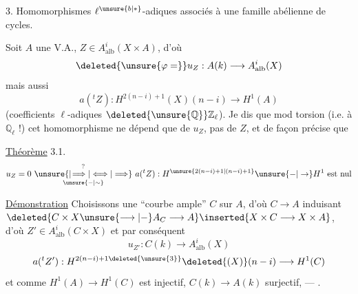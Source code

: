 3. Homomorphismes $\ell^{\unsure{b|*}}$-adiques associés à une
 famille abélienne de cycles.

Soit $A$ une V.A., $Z\in A^i_{\mathrm{alb}}(X\times A)$, d'où
\[
\deleted{\unsure{\varphi=}}u_Z:A(k)\longrightarrow A^i_{\mathrm{alb}}(X)
\]
mais aussi
\[
a({}^t Z):H^{2(n-i)+1}(X)(n-i)\longrightarrow H^1(A)
\]
(coefficients $\ell$-adiques $\deleted{\unsure{\mathbb Q}}\mathbb Z_\ell$). Je dis que
mod torsion (i.e. à  $\mathbb Q_\ell$ !) cet
homomorphisme ne dépend que de $u_Z$, pas de $Z$,
 et de façon précise que

\uline{Théorème} 3.1. 
\[
u_Z=0\ \overset{?}{\underset{\unsure{-|\sim}}{\unsure{\vert\!\Longrightarrow|\Longleftrightarrow|\Longrightarrow}}}\ a({}^t Z):H^{\unsure{2(n-i)+1|(n-i)+1}}\unsure{-|\to}H^1\ \text{est nul}
\]

\uline{Démonstration} Choisissons une ``courbe ample''
$C$ sur $A$,  d'où $C\longrightarrow A$ induisant
$\deleted{C\times X\unsure{\longrightarrow|-} A_C\longrightarrow A}\inserted{X\times C\longrightarrow X\times A}$, d'où $Z'\in A^i_{\mathrm{alb}}(C\times X)$ et
par conséquent
\[
u_{Z'}:C(k)\longrightarrow A^i_{\mathrm{alb}}(X)
\]
\[
a({}^t Z'):H^{2(n-i)+1\deleted{\unsure{3}}}\deleted{(X)}(n-i)\longrightarrow H^1(C)
\]
et comme $H^1(A)\longrightarrow H^1(C)$ est injectif, $C(k)\longrightarrow A(k)$
surjectif, --- .
